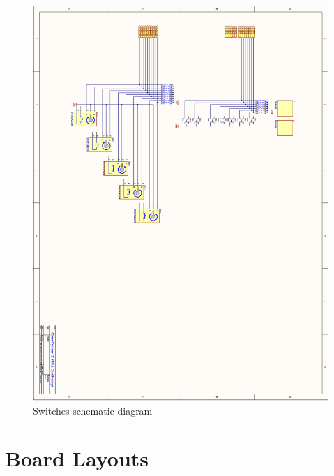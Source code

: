 \begin{appendices}
\begin{figure}[ht!]
    \centering
    \includegraphics[width=6in]{circuit/switches_page.png}
		\caption{Switches schematic diagram}
\end{figure}

\chapter{Board Layouts} \label{App:boardlayouts}


\end{appendices}
